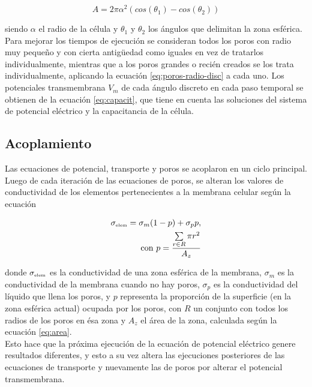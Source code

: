 \documentclass[a4paper,10pt]{article}
\begin{document}
\begin{equation} \label{eq:area}
	A = 2 \pi \alpha^2 (cos(\theta_1) - cos(\theta_2))
\end{equation}

siendo $\alpha$ el radio de la célula y $\theta_1$ y $\theta_2$ los ángulos que delimitan la zona esférica.\\

Para mejorar los tiempos de ejecución se consideran todos los poros con radio muy pequeño y con cierta antigüedad como iguales en vez de tratarlos individualmente, mientras que a los poros grandes o recién creados se los trata individualmente, aplicando la ecuación \ref{eq:poros-radio-disc} a cada uno. Los potenciales transmembrana $V_m$ de cada ángulo discreto en cada paso temporal se obtienen de la ecuación \ref{eq:capacit}, que tiene en cuenta las soluciones del sistema de potencial eléctrico y la capacitancia de la célula.\\

\subsection{Acoplamiento}
Las ecuaciones de potencial, transporte y poros se acoplaron en un ciclo principal. Luego de cada iteración de las ecuaciones de poros, se alteran los valores de conductividad de los elementos pertenecientes a la membrana celular según la ecuación 

\begin{equation} \begin{split}
	\sigma_{\textrm{\tiny elem}} = \sigma_m (1 - p) + \sigma_p p, \\ \textrm{con } p = \frac{ \sum\limits_{r \in R} \pi r^2 }{A_z}
\end{split} \end{equation} 

donde $\sigma_{\textrm{\tiny elem}}$ es la conductividad de una zona esférica de la membrana, $\sigma_m$ es la conductividad de la membrana cuando no hay poros, $\sigma_p$ es la conductividad del líquido que llena los poros, y $p$ representa la proporción de la superficie (en la zona esférica actual) ocupada por los poros, con $R$ un conjunto con todos los radios de los poros en ésa zona y $A_z$ el área de la zona, calculada según la ecuación \ref{eq:area}.\\

Esto hace que la próxima ejecución de la ecuación de potencial eléctrico genere resultados diferentes, y esto a su vez altera las ejecuciones posteriores de las ecuaciones de transporte y nuevamente las de poros por alterar el potencial transmembrana.\\
\end{document}
